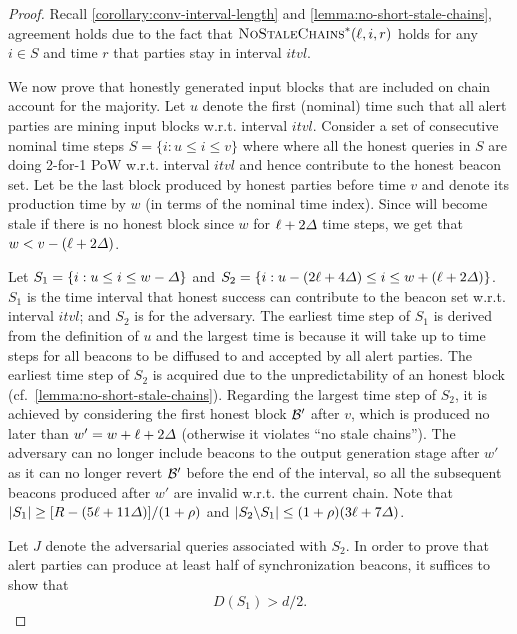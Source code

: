 \begin{proof}
    Recall \cref{corollary:conv-interval-length} and \cref{lemma:no-short-stale-chains}, agreement holds due to the fact that $\textsc{NoStaleChains}^\ast(\ell,\allowbreak i, r)$ holds for any $i \in S$ and time $r$ that parties stay in interval $itvl$.

    We now prove that honestly generated input blocks that are included on chain account for the majority.
    Let $u$ denote the first (nominal) time such that all alert parties are mining input blocks w.r.t. interval $itvl$.
    Consider a set of consecutive nominal time steps $S = \{i : u \le i \le v \}$ where where all the honest queries in $S$ are doing 2-for-1 PoW w.r.t. interval $itvl$ and hence contribute to the honest beacon set.
    Let \block be the last block produced by honest parties before time $v$ and denote its production time by $w$ (in terms of the nominal time index).
    Since \chain will become stale if there is no honest block since $w$ for $\ell + 2\varDelta$ time steps, we get that $w < v - (\ell + 2\varDelta)$.

    Let $S_1 = \{i : u \le i \le w - \varDelta \}$ and $S_2 = \{i : u - (2\ell + 4\varDelta ) \le i \le w + (\ell + 2\varDelta)\}$.
    $S_1$ is the time interval that honest success can contribute to the beacon set w.r.t. interval $itvl$; and $S_2$ is for the adversary.
    The earliest time step of $S_1$ is derived from the definition of $u$ and the largest time is because it will take up to \delay time steps for all beacons to be diffused to and accepted by all alert parties.
    The earliest time step of $S_2$ is acquired due to the unpredictability of an honest block (cf.~\cref{lemma:no-short-stale-chains}).
    Regarding the largest time step of $S_2$, it is achieved by considering the first honest block $\mathcal{B}'$ after $v$, which is produced no later than $w' = w + \ell + 2\varDelta$ (otherwise it violates ``no stale chains'').
    The adversary can no longer include beacons to the output generation stage after $w'$ as it can no longer revert $\mathcal{B}'$ before the end of the interval, so all the subsequent beacons produced after $w'$ are invalid w.r.t. the current chain.
    Note that $|S_1| \ge [R - (5\ell + 11 \varDelta)] / (1 + \rho)$ and $|S_2 \backslash S_1| \le (1 + \rho)(3\ell + 7 \varDelta)$.

    Let $J$ denote the adversarial queries associated with $S_2$.
    In order to prove that alert parties can produce at least half of synchronization beacons, it suffices to show that
    \[ D(S_1) > d / 2. \]


\end{proof}
